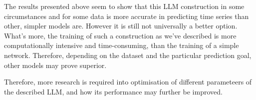 The results presented above seem to show that this LLM construction in some circumstances and for some data is more accurate in predicting time series than other, simpler models are.
However it is still not universally a better option. What's more, the training of such a construction as we've described is more computationally intensive and time-consuming, than the training of a simple network.
Therefore, depending on the dataset and the particular prediction goal, other models may prove superior.

Therefore, more research is required into optimisation of different parameteers of the described LLM, and how its performance may further be improved.

